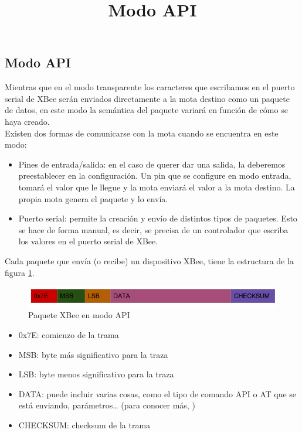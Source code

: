 \subsection{Modo API}
\title{Modo API}

Mientras que en el modo transparente los caracteres que escribamos en el puerto
serial de XBee serán enviados directamente a la mota destino como un paquete de datos, en este modo la semántica
del paquete variará en función de cómo se haya creado.\\

Existen dos formas de comunicarse con la mota cuando se encuentra en este modo:
\begin{itemize}
  \item Pines de entrada/salida: en el caso de querer dar una salida, la deberemos preestablecer en la configuración.
  Un pin que se configure en modo entrada, tomará el valor que le llegue y la mota enviará el valor a la mota destino.
  La propia mota genera el paquete y lo envía.
  \item Puerto serial: permite la creación y envío de distintos tipos de paquetes.
  Esto se hace de forma manual, es decir, se precisa de un controlador que escriba los valores en el puerto serial de XBee.
\end{itemize}

Cada paquete que envía (o recibe) un dispositivo XBee, tiene la estructura de la figura \ref{fig:tramaapi}.

\begin{figure}[htb]
\centering
\includegraphics[width=1\textwidth]{./imagenes/tramaapi}
\caption{Paquete XBee en modo API} \label{fig:tramaapi}
\end{figure}

\begin{itemize}
  \item 0x7E: comienzo de la trama
  \item MSB: byte más significativo para la traza
  \item LSB: byte menos significativo para la traza
  \item DATA: puede incluir varias cosas, como el tipo de comando API o AT que se está enviando, parámetros… (para conocer más, )
  \item CHECKSUM: checksum de la trama
\end{itemize}

